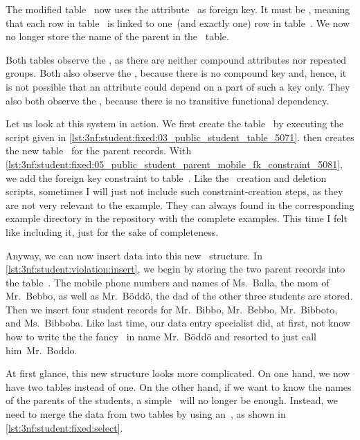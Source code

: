 The modified table~ now uses the attribute~ as foreign key.
It must be , meaning that each row in table~ is linked to one~(and exactly one) row in table~.
We now no longer store the name of the parent in the ~table.

Both tables observe the , as there are neither compound attributes nor repeated groups.
Both also observe the , because there is no compound key and, hence, it is not possible that an attribute could depend on a part of such a key only.
They also both observe the , because there is no transitive functional dependency.

Let us look at this system in action.
We first create the table~ by executing the script given in \cref{lst:3nf:student:fixed:03_public_student_table_5071}.
 then creates the new table~ for the parent records.
With \cref{lst:3nf:student:fixed:05_public_student_parent_mobile_fk_constraint_5081}, we add the foreign key constraint to table~.
Like the \db\ creation and deletion scripts, sometimes I will just not include such constraint-creation steps, as they are not very relevant to the example.
They can always found in the corresponding example directory in the repository \href{\xdef\databasesCodeRepo}{\databasesCodeRepoName} with the complete examples.
This time I felt like including it, just for the sake of completeness.

Anyway, we can now insert data into this new \db\ structure.
In \cref{lst:3nf:student:violation:insert}, we begin by storing the two parent records into the table~.
The mobile phone numbers and names of Ms.~Balla, the mom of Mr.~Bebbo, as well as Mr.~B{\"o}dd{\"o}, the dad of the other three students are stored.
Then we insert four student records for Mr.~Bibbo, Mr.~Bebbo, Mr.~Bibboto, and Ms.~Bibboba.
Like last time, our data entry specialist did, at first, not know how to write the the fancy~ in name Mr.~B{\"o}dd{\"o} and resorted to just call him~Mr.~Boddo.

At first glance, this new structure looks more complicated.
On one hand, we now have two tables instead of one.
On the other hand, if we want to know the names of the parents of the students, a simple~ will no longer be enough.
Instead, we need to merge the data from two tables by using an~, as shown in \cref{lst:3nf:student:fixed:select}.

